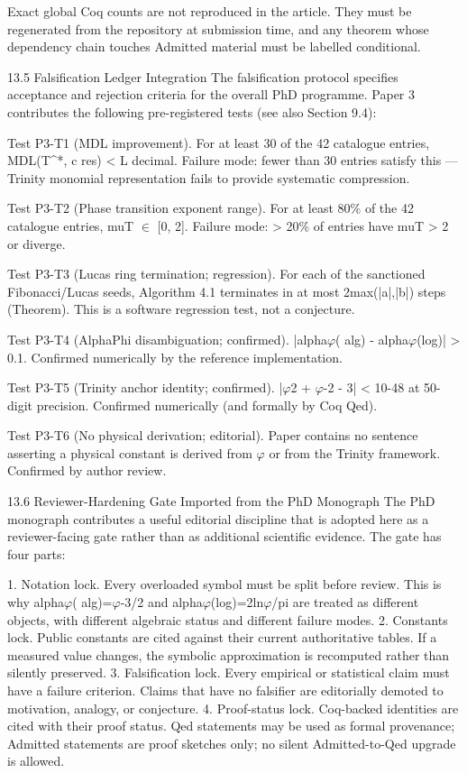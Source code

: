   Exact global Coq counts are not reproduced in the article. They must be regenerated
  from the repository at submission time, and any theorem whose dependency chain
  touches Admitted material must be labelled conditional.

  13.5 Falsification Ledger Integration
  The falsification protocol specifies acceptance and rejection criteria for the overall PhD
  programme. Paper 3 contributes the following pre-registered tests (see also Section
  9.4):

  Test P3-T1 (MDL improvement). For at least 30 of the 42 catalogue entries, MDL(T\textasciicircum{}*, c
  res) < L decimal. Failure mode: fewer than 30 entries satisfy this --- Trinity monomial
  representation fails to provide systematic compression.

  Test P3-T2 (Phase transition exponent range). For at least 80\% of the 42 catalogue
  entries, muT $\in$ [0, 2]. Failure mode: > 20\% of entries have muT > 2 or diverge.

  Test P3-T3 (Lucas ring termination; regression). For each of the sanctioned
  Fibonacci/Lucas seeds, Algorithm 4.1 terminates in at most 2max(|a|,|b|) steps
  (Theorem). This is a software regression test, not a conjecture.

  Test P3-T4 (AlphaPhi disambiguation; confirmed). |alpha$\varphi$( alg) - alpha$\varphi$(log)| > 0.1.
  Confirmed numerically by the reference implementation.

  Test P3-T5 (Trinity anchor identity; confirmed). |$\varphi$2 + $\varphi$-2 - 3| < 10-48 at 50-digit
  precision. Confirmed numerically (and formally by Coq Qed).

  Test P3-T6 (No physical derivation; editorial). Paper contains no sentence asserting a
  physical constant is derived from $\varphi$ or from the Trinity framework. Confirmed by author
  review.

  13.6 Reviewer-Hardening Gate Imported from the PhD Monograph
  The PhD monograph contributes a useful editorial discipline that is adopted here as a
  reviewer-facing gate rather than as additional scientific evidence. The gate has four
  parts:

  1. Notation lock. Every overloaded symbol must be split before review. This is why
  alpha$\varphi$( alg)=$\varphi$-3/2 and alpha$\varphi$(log)=2ln$\varphi$/pi are treated as different objects, with
  different algebraic status and different failure modes.
  2. Constants lock. Public constants are cited against their current authoritative tables.
  If a measured value changes, the symbolic approximation is recomputed rather than
  silently preserved.
  3. Falsification lock. Every empirical or statistical claim must have a failure criterion.
  Claims that have no falsifier are editorially demoted to motivation, analogy, or
  conjecture.
  4. Proof-status lock. Coq-backed identities are cited with their proof status. Qed
  statements may be used as formal provenance; Admitted statements are proof sketches
  only; no silent Admitted-to-Qed upgrade is allowed.

